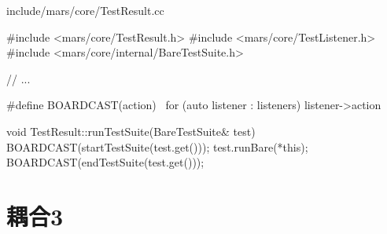 \begin{content}
\begin{nodiff}{include/mars/core/TestResult.cc}
 \begin{c++}
#include <mars/core/TestResult.h>
#include <mars/core/TestListener.h>
#include <mars/core/internal/BareTestSuite.h>

// ...

#define BOARDCAST(action) \
  for (auto listener : listeners) listener->action

void TestResult::runTestSuite(BareTestSuite& test) {
  BOARDCAST(startTestSuite(test.get()));
  test.runBare(*this);
  BOARDCAST(endTestSuite(test.get()));
}
 \end{c++}
\end{nodiff}

\end{content}

\section{耦合3}

